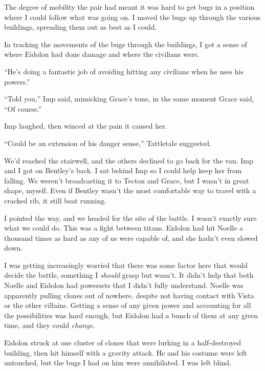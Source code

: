 The degree of mobility the pair had meant it was hard to get bugs in a position where I could follow what was going on.  I moved the bugs up through the various buildings, spreading them out as best as I could.



In tracking the movements of the bugs through the buildings, I got a sense of where Eidolon had done damage and where the civilians were.



``He's doing a fantastic job of avoiding hitting any civilians when he uses his powers.''



``Told you,'' Imp said, mimicking Grace's tone, in the same moment Grace said, ``Of course.''



Imp laughed, then winced at the pain it caused her.



``Could be an extension of his danger sense,'' Tattletale suggested.



We'd reached the stairwell, and the others declined to go back for the van.  Imp and I got on Bentley's back.  I sat behind Imp so I could help keep her from falling.  We weren't broadcasting it to Tecton and Grace, but I wasn't in great shape, myself.  Even if Bentley wasn't the most comfortable way to travel with a cracked rib, it still beat running.



I pointed the way, and we headed for the site of the battle.  I wasn't exactly sure what we could do.  This was a fight between titans.  Eidolon had hit Noelle a thousand times as hard as any of us were capable of, and she hadn't even slowed down.



I was getting increasingly worried that there was some factor here that would decide the battle, something I \emph{should} grasp but wasn't.  It didn't help that both Noelle and Eidolon had powersets that I didn't fully understand.  Noelle was apparently pulling clones out of nowhere, despite not having contact with Vista or the other villains.  Getting a sense of any given power and accounting for all the possibilities was hard enough, but Eidolon had a bunch of them at any given time, and they could \emph{change}.



Eidolon struck at one cluster of clones that were lurking in a half-destroyed building, then hit himself with a gravity attack.  He and his costume were left untouched, but the bugs I had on him were annihilated.  I was left blind.



